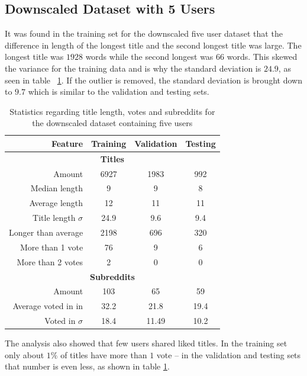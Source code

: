 \subsection{Downscaled Dataset with 5 Users}
\label{sec:five-user-data-set}
It was found in the training set for the downscaled five user dataset that the difference in length of the longest title and the second longest title was large. The longest title was $1928$ words while the second longest was $66$ words. This skewed the variance for the training data and is why the standard deviation is $24.9$, as seen in table \ \ref{table:5_user_stats}. If the outlier is removed, the standard deviation is brought down to $9.7$ which is similar to the validation and testing sets.
\begin{table}[H]
    \centering
    \begin{tabular}{ r | c | c | c }
    \textbf{Feature} & \textbf{Training} & \textbf{Validation} & \textbf{Testing} \\ \hline \hline
    \multicolumn{4}{c}{\textbf{Titles}} \\ \hline \hline
    Amount & 6927 & 1983 & 992 \\ \hline
    Median length & 9 & 9 & 8 \\ \hline
    Average length & 12 & 11 & 11  \\ \hline
    Title length $\sigma$ & 24.9 & 9.6 & 9.4 \\ \hline
    Longer than average & 2198 & 696 & 320 \\ \hline
    More than 1 vote & 76 & 9 & 6 \\ \hline
    More than 2 votes & 2 & 0 & 0\\ \hline \hline
    \multicolumn{4}{c}{\textbf{Subreddits}} \\ \hline \hline
    Amount & 103 & 65 & 59  \\ \hline
    Average voted in in & 32.2 & 21.8 & 19.4 \\ \hline
    Voted in $\sigma$ & 18.4 & 11.49 & 10.2  \\ \hline
    \end{tabular}
    \caption{Statistics regarding title length, votes and subreddits for the downscaled dataset containing five users}
    \label{table:5_user_stats}
\end{table}
The analysis also showed that few users shared liked titles. In the training set only about $1\%$ of titles have more than $1$ vote -- in the validation and testing sets that number is even less, as shown in table \ref{table:5_user_stats}.

